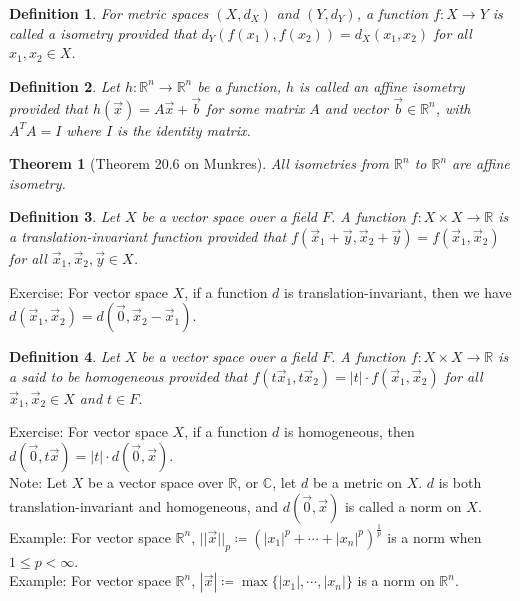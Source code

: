 \documentclass[15pt]{book}
\theoremstyle{break}
\theoremstyle{break}
\newtheorem{thm}{Theorem}[section]
\newtheorem{defn}{Definition}[corL]
\newcommand{\R}{\mathbb{R}}
\newcommand{\Complex}{\mathbb{C}}
\newcommand{\note}{\color{red}Note: \color{black}}
\newcommand{\example}{\color{green}Example: \color{black}}
\newcommand{\exercise}{\color{green}Exercise: \color{black}}
\begin{document}
\begin{defn}
For metric spaces $(X, d_X)$ and $(Y, d_Y)$, a function $f:X \to Y$ is called a isometry provided that $d_Y(f(x_1),f(x_2)) = d_X(x_1,x_2)$ for all $x_1,x_2 \in X$. 
\end{defn}

\begin{defn}
Let $h:\R^n \to \R^n$ be a function, $h$ is called an affine isometry provided that $h(\vec{x})= A\vec{x}+\vec{b}$ for some matrix $A$ and vector $\vec{b}\in \R^n$, with $A^TA = I$ where $I$ is the identity matrix. 
\end{defn}

\begin{thm}[Theorem 20.6 on Munkres]
All isometries from $\R^n$ to $\R^n$ are affine isometry.
\end{thm}

\begin{defn}
Let $X$ be a vector space over a field $F$. A function $f: X \times X \to \R$ is a translation-invariant function provided that $f(\vec{x}_1+\vec{y},\vec{x}_2+\vec{y}) = f(\vec{x}_1,\vec{x}_2)$ for all $\vec{x}_1,\vec{x}_2,\vec{y}\in X$.
\end{defn}

\exercise For vector space $X$, if a function $d$ is translation-invariant, then we have $d(\vec{x}_1,\vec{x}_2) = d(\vec{0},\vec{x}_2-\vec{x}_1)$.

\begin{defn}
Let $X$ be a vector space over a field $F$. A function $f:X \times X \to \R$ is a said to be homogeneous provided that $f(t\vec{x}_1,t\vec{x}_2) = |t|\cdot f(\vec{x}_1,\vec{x}_2)$ for all $\vec{x}_1,\vec{x}_2\in X$ and $t \in F$.
\end{defn}


\exercise For vector space $X$, if a function $d$ is homogeneous, then $d(\vec{0},t\vec{x}) = |t|\cdot d(\vec{0},\vec{x})$. \\


\note Let $X$ be a vector space over $\R$, or $\Complex$, let $d$ be a metric on $X$. $d$ is both translation-invariant and homogeneous, and $d(\vec{0},\vec{x})$ is called a norm on $X$.\\


\example For vector space $\R^n$, $||\vec{x}||_p \coloneqq (|x_1|^p + \cdots + |x_n|^p )^\frac{1}{p}$ is a norm when $1\leq p < \infty$.\\
\example For vector space $\R^n$, $|\vec{x}| \coloneqq \max\{|x_1|,\cdots, |x_n|\}$ is a norm on $\R^n$.\\
\end{document}
